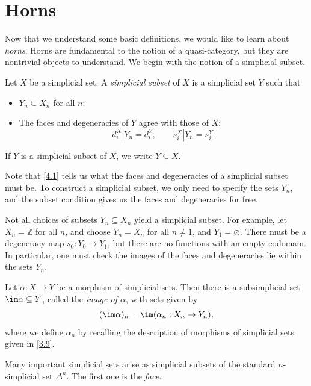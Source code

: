 \section{Horns}

Now that we understand some basic definitions, we would like to learn about \emph{horns}. Horns are fundamental to the notion of a quasi-category, but they are nontrivial objects to understand. We begin with the notion of a simplicial subset.

\begin{definition}\label{4.1}
	Let $X$ be a simplicial set. A \emph{simplicial subset} of $X$ is a simplicial set $Y$ such that
	\begin{itemize}
		\item $Y_n \subseteq X_n$ for all $n$;
		\item The faces and degeneracies of $Y$ agree with those of $X$:
			\[
				d_i^X|Y_n = d_i^Y,\qquad s_i^X|Y_n=s_i^Y
			.\]
	\end{itemize}
	If $Y$ is a simplicial subset of $X$, we write $Y\subseteq X$.
\end{definition}

Note that \cref{4.1} tells us what the faces and degeneracies of a simplicial subset must be. To construct a simplicial subset, we only need to specify the sets $Y_n$, and the subset condition gives us the faces and degeneracies for free.

\begin{warning}\label{4.2}
	Not all choices of subsets $Y_n\subseteq X_n$ yield a simplicial subset. For example, let $X_n=\mathbb{Z} $ for all $n$, and choose $Y_n=X_n$ for all $n\neq 1$, and $Y_1=\varnothing $. There must be a degeneracy map $s_0 : Y_0 \to Y_1$, but there are no functions with an empty codomain. In particular, one must check the images of the faces and degeneracies lie within the sets $Y_n$.
\end{warning}

\begin{definition}\label{4.3}
	Let $\alpha : X \to Y$ be a morphism of simplicial sets. Then there is a subsimplicial set $\im \alpha \subseteq Y$, called the \emph{image of $\alpha $}, with sets given by
	\[
		(\im \alpha )_n=\im (\alpha _n : X_n \to Y_n)
	,\]
	where we define $\alpha _n$ by recalling the description of morphisms of simplicial sets given in \cref{3.9}.
\end{definition}

Many important simplicial sets arise as simplicial subsets of the standard $n$-simplicial set $\Delta ^n$. The first one is the \emph{face}.

